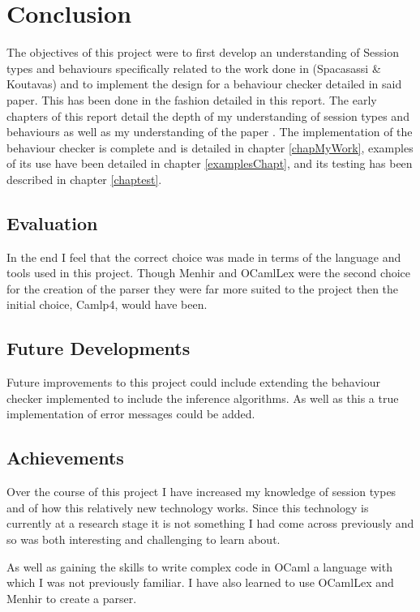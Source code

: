 \chapter{Conclusion}

The objectives of this project were to first develop an understanding of Session types and behaviours specifically related to the work done in (Spacasassi \& Koutavas)\cite{paper1} and to implement the design for a behaviour checker detailed in said paper. This has been done in the fashion detailed in this report. The early chapters of this report detail the depth of my understanding of session types and behaviours as well as my understanding of the paper \cite{paper1}. The implementation of the behaviour checker is complete and is detailed in chapter \ref{chapMyWork}, examples of its use have been detailed in chapter \ref{examplesChapt}, and its testing has been described in chapter \ref{chaptest}. 

\section{Evaluation}

In the end I feel that the correct choice was made in terms of the language and tools used in this project. Though Menhir and OCamlLex were the second choice for the creation of the parser they were far more suited to the project then the initial choice, Camlp4, would have been. 

\section{Future Developments}

Future improvements to this project could include extending the behaviour checker implemented to include the inference algorithms. As well as this a true implementation of error messages could be added. 

\section{Achievements}

Over the course of this project I have increased my knowledge of session types and of how this relatively new technology works. Since this technology is currently at a research stage it is not something I had come across previously and so was both interesting and challenging to learn about.

As well as gaining the skills to write complex code in OCaml a language with which I was not previously familiar. I have also learned to use OCamlLex and Menhir to create a parser. 

